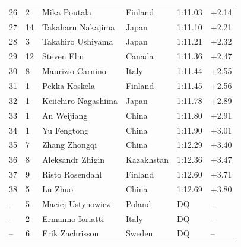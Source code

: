 \documentclass{article}
\begin{document}
\begin{tabular}{llllll}
26 & 2 & Mika Poutala & Finland & 1:11.03 & +2.14 \\
27 & 14 & Takaharu Nakajima & Japan & 1:11.10 & +2.21 \\
28 & 3 & Takahiro Ushiyama & Japan & 1:11.21 & +2.32 \\
29 & 12 & Steven Elm & Canada & 1:11.36 & +2.47 \\
30 & 8 & Maurizio Carnino & Italy & 1:11.44 & +2.55 \\
31 & 1 & Pekka Koskela & Finland & 1:11.45 & +2.56 \\
32 & 1 & Keiichiro Nagashima & Japan & 1:11.78 & +2.89 \\
33 & 1 & An Weijiang & China & 1:11.80 & +2.91 \\
34 & 1 & Yu Fengtong & China & 1:11.90 & +3.01 \\
35 & 7 & Zhang Zhongqi & China & 1:12.29 & +3.40 \\
36 & 8 & Aleksandr Zhigin & Kazakhstan & 1:12.36 & +3.47 \\
37 & 9 & Risto Rosendahl & Finland & 1:12.60 & +3.71 \\
38 & 5 & Lu Zhuo & China & 1:12.69 & +3.80 \\
– & 5 & Maciej Ustynowicz & Poland & DQ & – \\
– & 2 & Ermanno Ioriatti & Italy & DQ & – \\
– & 6 & Erik Zachrisson & Sweden & DQ & – \\
\bottomrule
\end{tabular}
\end{document}
